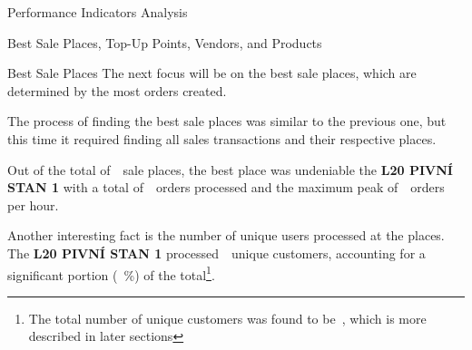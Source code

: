 \begin{section}{Performance Indicators Analysis}
\begin{subsection}{Best Sale Places, Top-Up Points, Vendors, and Products}
\begin{subsubsection}{Best Sale Places}
			The next focus will be on the best sale places, which are determined by the most orders created.


			The process of finding the best sale places was similar to the previous one, but this time it required finding all sales transactions and their respective places.

			Out of the total of~~sale places, the best place was undeniable the \textbf{L20 PIVNÍ STAN 1} with a total of~~orders processed and the maximum peak of~~orders per hour.

			Another interesting fact is the number of unique users processed at the places.
			The \textbf{L20 PIVNÍ STAN 1} processed~~unique customers, accounting for a significant portion (~\%)
			of the total\footnote{The total number of unique customers was found to be~, which is more described in later sections}.


\end{subsubsection}
\end{subsection}
\end{section}
